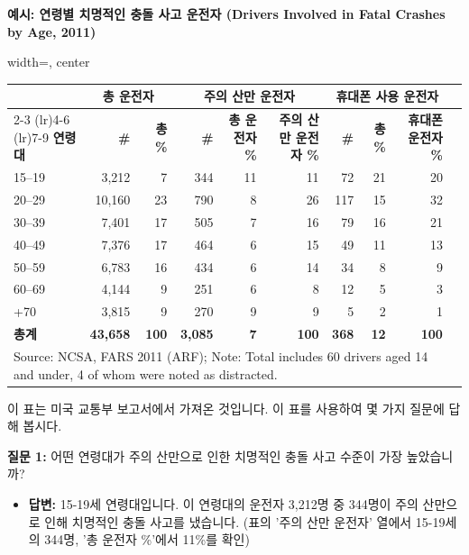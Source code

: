 \documentclass[11pt,a4paper]{article}
\theoremstyle{definition}
\begin{document}
\begin{examplebox}
\textbf{예시: 연령별 치명적인 충돌 사고 운전자 (Drivers Involved in Fatal Crashes by Age, 2011)}

\begin{center}
\label{tab:fatal_crashes}
\begin{adjustbox}{width=\textwidth, center}
\begin{tabular}{lrrrrrrrrr}
\toprule
& \multicolumn{2}{c}{\textbf{총 운전자}} & \multicolumn{3}{c}{\textbf{주의 산만 운전자}} & \multicolumn{3}{c}{\textbf{휴대폰 사용 운전자}} \\
\cmidrule(lr){2-3} \cmidrule(lr){4-6} \cmidrule(lr){7-9}
\textbf{연령대} & \textbf{\#} & \textbf{총 \%} & \textbf{\#} & \textbf{총 운전자 \%} & \textbf{주의 산만 운전자 \%} & \textbf{\#} & \textbf{총 \%} & \textbf{휴대폰 운전자 \%} \\
\midrule
15–19 & 3,212 & 7 & 344 & 11 & 11 & 72 & 21 & 20 \\
20–29 & 10,160 & 23 & 790 & 8 & 26 & 117 & 15 & 32 \\
30–39 & 7,401 & 17 & 505 & 7 & 16 & 79 & 16 & 21 \\
40–49 & 7,376 & 17 & 464 & 6 & 15 & 49 & 11 & 13 \\
50–59 & 6,783 & 16 & 434 & 6 & 14 & 34 & 8 & 9 \\
60–69 & 4,144 & 9 & 251 & 6 & 8 & 12 & 5 & 3 \\
+70 & 3,815 & 9 & 270 & 9 & 9 & 5 & 2 & 1 \\
\midrule
\textbf{총계} & \textbf{43,658} & \textbf{100} & \textbf{3,085} & \textbf{7} & \textbf{100} & \textbf{368} & \textbf{12} & \textbf{100} \\
\bottomrule
\multicolumn{9}{l}{\small Source: NCSA, FARS 2011 (ARF); Note: Total includes 60 drivers aged 14 and under, 4 of whom were noted as distracted.} \\
\end{tabular}
\end{adjustbox}
\end{center}
이 표는 미국 교통부 보고서에서 가져온 것입니다. 이 표를 사용하여 몇 가지 질문에 답해 봅시다.

\textbf{질문 1:} 어떤 연령대가 주의 산만으로 인한 치명적인 충돌 사고 수준이 가장 높았습니까?
\begin{itemize}
    \item \textbf{답변:} 15-19세 연령대입니다. 이 연령대의 운전자 3,212명 중 344명이 주의 산만으로 인해 치명적인 충돌 사고를 냈습니다. (표의 '주의 산만 운전자' 열에서 15-19세의 344명, '총 운전자 \%'에서 11\%를 확인)
\end{itemize}


\end{examplebox}
\end{document}
